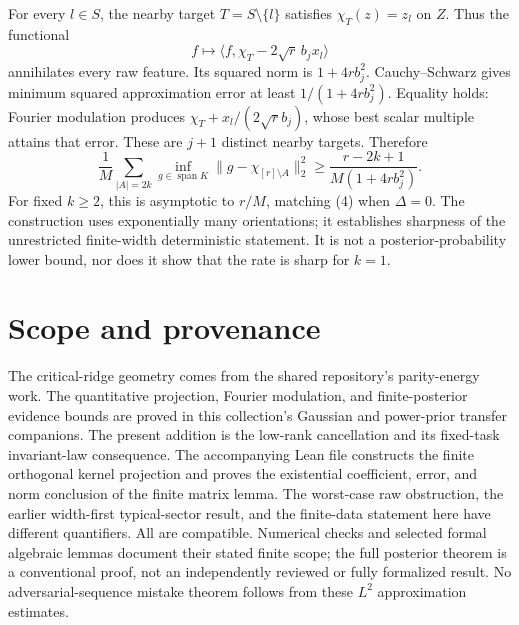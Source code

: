 \documentclass[11pt]{article}
\begin{document}
For every $l\in S$, the nearby target $T=S\setminus\{l\}$ satisfies
$\chi_T(z)=z_l$ on $Z$. Thus the functional
\[
             f\longmapsto\langle f,\chi_T-2\sqrt r\,b_j x_l\rangle
\]
annihilates every raw feature. Its squared norm is $1+4r b_j^2$.
Cauchy--Schwarz gives minimum squared approximation error at least
$1/(1+4r b_j^2)$. Equality holds: Fourier modulation produces
$\chi_T+x_l/(2\sqrt r b_j)$, whose best scalar multiple attains
that error. These are $j+1$ distinct nearby targets. Therefore
\[
 \frac1M\sum_{|A|=2k}\inf_{g\in\operatorname{span}K}
          \|g-\chi_{[r]\setminus A}\|_2^2
       \ge\frac{r-2k+1}{M(1+4r b_j^2)}.
 \tag{11}
\]
For fixed $k\ge2$, this is asymptotic to $r/M$, matching (4) when
$\Delta=0$. The construction uses exponentially many orientations;
it establishes sharpness of the unrestricted finite-width deterministic
statement. It is not a posterior-probability lower bound, nor does it
show that the rate is sharp for $k=1$.

\section*{Scope and provenance}
The critical-ridge geometry comes from the shared repository's
parity-energy work. The quantitative projection, Fourier modulation,
and finite-posterior evidence bounds are proved in this collection's
Gaussian and power-prior transfer companions. The present addition is
the low-rank cancellation and its fixed-task invariant-law consequence.
The accompanying Lean file constructs the finite orthogonal kernel
projection and proves the existential coefficient, error, and norm
conclusion of the finite matrix lemma. The worst-case raw obstruction, the earlier width-first typical-sector
result, and the finite-data statement here have different quantifiers.
All are compatible. Numerical checks and selected formal algebraic
lemmas document their stated finite scope; the full posterior theorem
is a conventional proof, not an independently reviewed or fully
formalized result. No adversarial-sequence mistake theorem follows from
these $L^2$ approximation estimates.
\end{document}
